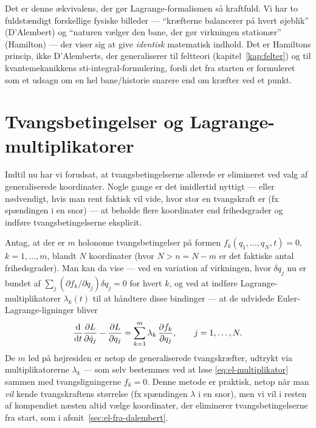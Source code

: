 \begin{bemaerkning}
Det er denne ækvivalens, der gør Lagrange-formalismen så kraftfuld.
Vi har to fuldstændigt forskellige fysiske billeder — ``kræfterne
balancerer på hvert øjeblik'' (D'Alembert) og ``naturen vælger den bane,
der gør virkningen stationær'' (Hamilton) — der viser sig at give
\emph{identisk} matematisk indhold. Det er Hamiltons princip, ikke
D'Alemberts, der generaliserer til feltteori
(kapitel~\ref{kap:felter}) og til kvantemekanikkens
sti-integral-formulering, fordi det fra starten er formuleret som et
udsagn om en hel bane/historie snarere end om kræfter ved et punkt.
\end{bemaerkning}

\section{Tvangsbetingelser og Lagrange-multiplikatorer}

Indtil nu har vi forudsat, at tvangsbetingelserne allerede er
elimineret ved valg af generaliserede koordinater. Nogle gange er det
imidlertid nyttigt — eller nødvendigt, hvis man rent faktisk vil vide,
hvor stor en tvangskraft er (fx spændingen i en snor) — at beholde
flere koordinater end frihedsgrader og indføre tvangsbetingelserne
eksplicit.

Antag, at der er $m$ holonome tvangsbetingelser på formen
$f_k(q_1,\dots,q_N,t)=0$, $k=1,\dots,m$, blandt $N$ koordinater (hvor
$N>n=N-m$ er det faktiske antal frihedsgrader). Man kan da vise — ved
en variation af virkningen, hvor $\delta q_j$ nu er bundet af
$\sum_j (\partial f_k/\partial q_j)\delta q_j = 0$ for hvert $k$, og ved
at indføre Lagrange-multiplikatorer $\lambda_k(t)$ til at håndtere
disse bindinger — at de udvidede Euler-Lagrange-ligninger bliver
\begin{equation}
  \dv{t}\pdv{L}{\dot q_j} - \pdv{L}{q_j} = \sum_{k=1}^m \lambda_k\,\pdv{f_k}{q_j}, \qquad j=1,\dots,N.
  \label{eq:el-multiplikator}
\end{equation}
De $m$ led på højresiden er netop de generaliserede tvangskræfter,
udtrykt via multiplikatorerne $\lambda_k$ — som selv bestemmes ved at
løse \eqref{eq:el-multiplikator} sammen med tvangsligningerne
$f_k=0$. Denne metode er praktisk, netop når man \emph{vil} kende
tvangskraftens størrelse (fx spændingen $\lambda$ i en snor), men vi
vil i resten af kompendiet næsten altid vælge koordinater, der
eliminerer tvangsbetingelserne fra start, som i
afsnit~\ref{sec:el-fra-dalembert}.

